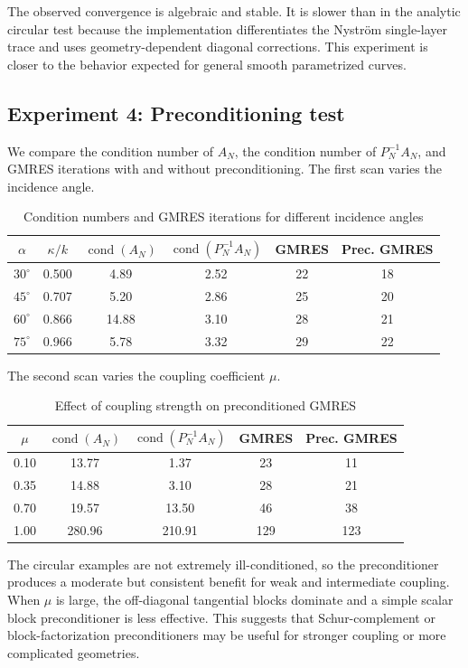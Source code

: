 \documentclass[11pt]{article}
\numberwithin{equation}{section}
\begin{document}
The observed convergence is algebraic and stable. It is slower than in the analytic circular test because the implementation differentiates the Nystr\"om single-layer trace and uses geometry-dependent diagonal corrections. This experiment is closer to the behavior expected for general smooth parametrized curves.

\subsection{Experiment 4: Preconditioning test}

We compare the condition number of $A_N$, the condition number of $P_N^{-1}A_N$, and GMRES iterations with and without preconditioning. The first scan varies the incidence angle.

\begin{table}[htbp]
\centering
\caption{Condition numbers and GMRES iterations for different incidence angles}
\begin{tabular}{cccccc}
\toprule
$\alpha$ & $\kappa/k$ & $\operatorname{cond}(A_N)$ & $\operatorname{cond}(P_N^{-1}A_N)$ & GMRES & Prec. GMRES\\
\midrule
$30^\circ$&0.500&4.89&2.52&22&18\\
$45^\circ$&0.707&5.20&2.86&25&20\\
$60^\circ$&0.866&14.88&3.10&28&21\\
$75^\circ$&0.966&5.78&3.32&29&22\\
\bottomrule
\end{tabular}
\end{table}

The second scan varies the coupling coefficient $\mu$.
\begin{table}[htbp]
\centering
\caption{Effect of coupling strength on preconditioned GMRES}
\begin{tabular}{ccccc}
\toprule
$\mu$ & $\operatorname{cond}(A_N)$ & $\operatorname{cond}(P_N^{-1}A_N)$ & GMRES & Prec. GMRES\\
\midrule
0.10&13.77&1.37&23&11\\
0.35&14.88&3.10&28&21\\
0.70&19.57&13.50&46&38\\
1.00&280.96&210.91&129&123\\
\bottomrule
\end{tabular}
\end{table}

The circular examples are not extremely ill-conditioned, so the preconditioner produces a moderate but consistent benefit for weak and intermediate coupling. When $\mu$ is large, the off-diagonal tangential blocks dominate and a simple scalar block preconditioner is less effective. This suggests that Schur-complement or block-factorization preconditioners may be useful for stronger coupling or more complicated geometries.
\end{document}
